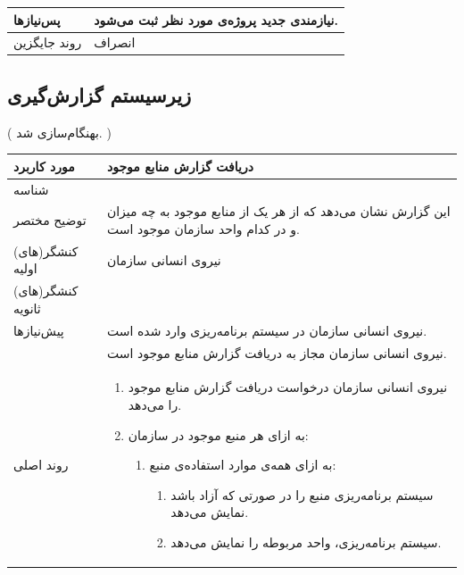 \begin{table}[H]
\begin{tabular}{|p{3cm}|p{10cm}|}
		\hline
		
		پس‌نیازها &
		نیازمندی جدید پروژه‌ی مورد نظر ثبت می‌شود. \\
		\hline
		
		روند جایگزین
		& انصراف \\
		\hline
		
	\end{tabular}
\end{table}

\newpage
\subsection{زیرسیستم گزارش‌گیری}

({\color{red} بهنگام‌سازی شد.  })
\begin{table}[H]
	\centering
	\begin{tabular}{|p{3cm}|p{10cm}|}
		\hline
		مورد کاربرد & دریافت گزارش منابع موجود  \\
		\hline
		
		شناسه & 
		\stepcounter{usecase_ID}
		
		\arabic{usecase_ID} \\
		
		\hline
		
		توضیح مختصر & این گزارش نشان می‌دهد که از هر یک از منابع موجود به چه میزان و در کدام واحد سازمان موجود است. \\
		\hline
		
		کنشگر(های) اولیه& نیروی انسانی سازمان \\
		\hline
		
		کنشگر(های) ثانویه&  \\
		\hline
		
		پیش‌نیازها
		& نیروی انسانی سازمان در سیستم برنامه‌ریزی وارد شده است.\\
		& نیروی انسانی سازمان مجاز به دریافت گزارش منابع موجود است. \\
		\hline
		
		
		روند اصلی &
		\begin{enumerate}[topsep=0cm,leftmargin=0.5cm]
			\item نیروی انسانی سازمان درخواست دریافت گزارش منابع موجود را می‌دهد.
			\item به ازای هر منبع موجود در سازمان:
			\begin{enumerate}[topsep=0cm,leftmargin=0.5cm]
				\item به ازای همه‌ی موارد استفاده‌ی منبع:
				\begin{enumerate}[topsep=0cm,leftmargin=0.5cm]
					\item سیستم برنامه‌ریزی منبع را در صورتی که آزاد باشد نمایش می‌دهد.
					\item سیستم برنامه‌ریزی، واحد مربوطه را نمایش می‌دهد.
				\end{enumerate}
			\end{enumerate}
		\end{enumerate} \\
		\hline
		

\end{tabular}
\end{table}
